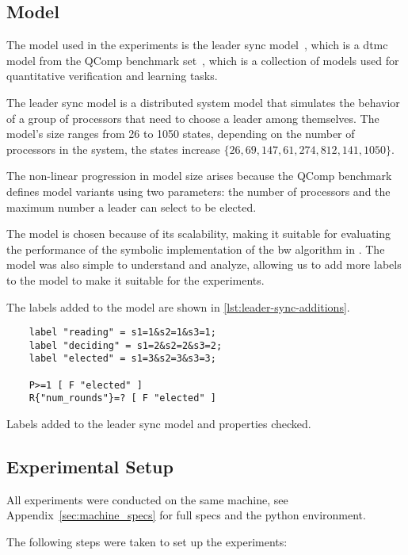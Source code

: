 \subsection{Model}
The model used in the experiments is the leader sync model~\cite{IR90}, which is a \gls{dtmc} model from the QComp benchmark set~\cite{hartmanns2019quantitative}, which is a collection of models used for quantitative verification and learning tasks.

The leader sync model is a distributed system model that simulates the behavior of a group of processors that need to choose a leader among themselves.
The model's size ranges from 26 to 1050 states, depending on the number of processors in the system, the states increase $\{26, 69, 147, 61, 274, 812, 141, 1050\}$.

The non-linear progression in model size arises because the QComp benchmark defines model variants using two parameters: the number of processors and the maximum number a leader can select to be elected.

The model is chosen because of its scalability, making it suitable for evaluating the performance of the symbolic implementation of the \gls{bw} algorithm in \JajapyTwo.
The model was also simple to understand and analyze, allowing us to add more labels to the model to make it suitable for the experiments.

The labels added to the model are shown in \autoref{lst:leader-sync-additions}.

\begin{listing}
    \begin{verbatim}
    label "reading" = s1=1&s2=1&s3=1;
    label "deciding" = s1=2&s2=2&s3=2;
    label "elected" = s1=3&s2=3&s3=3;

    P>=1 [ F "elected" ]
    R{"num_rounds"}=? [ F "elected" ]
    \end{verbatim}
    \caption{Labels added to the leader sync model and properties checked.}
    \label{lst:leader-sync-additions}
\end{listing}


\subsection{Experimental Setup}
All experiments were conducted on the same machine, see Appendix~\ref{sec:machine_specs} for full specs and the python environment.

The following steps were taken to set up the experiments:


